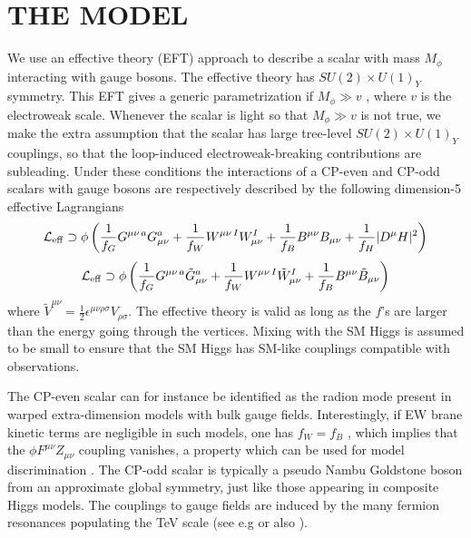 \documentclass[11pt]{cernrep}
\begin{document}
\section{THE MODEL}

We use an effective theory (EFT) approach to describe a scalar with mass $M_\phi$ interacting with gauge bosons. The effective theory has $SU(2)\times U(1)_Y$ symmetry. This EFT gives a generic parametrization if $M_\phi\gg v$ \cite{Fichet:2015yia}, where $v$ is the electroweak scale.
 Whenever the scalar is light so that $M_\phi\gg v$ is not true, we make the extra assumption that the scalar has large tree-level $SU(2)\times U(1)_Y$ couplings, so that the loop-induced electroweak-breaking contributions are subleading. 
Under these conditions the interactions of a CP-even and CP-odd scalars with gauge bosons are respectively described by the following dimension-5 effective Lagrangians 
\begin{equation}
{\cal L}_{\rm eff}\supset\phi \left( \frac{1}{f_G}G^{\mu\nu\,a}G_{\mu\nu}^a+ \frac{1}{f_W}W^{\mu\nu\,I}W_{\mu\nu}^I
+\frac{1}{f_B}B^{\mu\nu}B_{\mu\nu}+\frac{1}{f_H}|D^\mu H|^2
\right)
\end{equation}
\begin{equation}
{\cal L}_{\rm eff}\supset\phi \left( \frac{1}{f_G}G^{\mu\nu\,a}\tilde G_{\mu\nu}^a+ \frac{1}{f_W}W^{\mu\nu\,I}\tilde W_{\mu\nu}^I
+\frac{1}{f_B}B^{\mu\nu}\tilde B_{\mu\nu}
\right)
\end{equation}
where $\tilde V^{\mu\nu}=\frac{1}{2}\epsilon^{\mu\nu\rho\sigma}V_{\rho \sigma}$.
The effective theory is valid as long as the $f$'s are larger than the energy going through the vertices. 
 Mixing with the SM Higgs is assumed to be small to ensure that the SM Higgs has SM-like  couplings compatible with  observations.

The CP-even scalar can for instance be identified as the radion mode present in warped extra-dimension models with bulk gauge fields. Interestingly, if EW brane kinetic terms are negligible in such models, one has $f_W=f_B$ \cite{Fichet:2013ola, Fichet:2013gsa}, which implies that the $\phi F^{\mu\nu}Z_{\mu\nu}$ coupling vanishes, a property which can be used for model discrimination \cite{Baldenegro:2017aen}. 
The CP-odd scalar is typically a pseudo Nambu Goldstone boson from an approximate global symmetry, just like those appearing in composite Higgs models. The couplings to gauge fields are induced by the many fermion resonances populating the TeV scale (see e.g \cite{Belyaev:2016ftv} or also \cite{Fichet:2016xvs}). 
\end{document}
